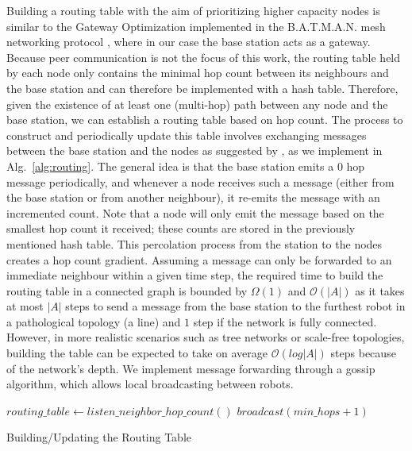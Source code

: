 Building a routing 
table with the aim of prioritizing higher capacity nodes is similar to the Gateway 
Optimization \cite{openMesh2021gateways} implemented in the \ac{B.A.T.M.A.N.} mesh networking
protocol \cite{johnson2008simple}, where in our case the base station acts as a gateway. Because peer communication is not the 
focus of this work, the routing table held by each node only contains the minimal hop count 
between its neighbours and the base station and can therefore
be implemented with a hash table. Therefore, given the existence of at least one (multi-hop) path between any node and the base station, we can establish a routing table based on hop count. The process to construct and periodically update this 
table involves exchanging messages between the base station and the nodes as suggested by 
\cite{abdullah2015detecting}, as we implement in Alg.~\ref{alg:routing}. The general idea is that the base station emits a 0 hop message periodically, and whenever a node receives such a message (either from the base station or from another neighbour), it re-emits the message with an incremented count. Note that a node will only emit the message based on the smallest hop count it received; these counts are stored in the previously mentioned hash table. This percolation process from the station to the nodes creates a hop count gradient.
Assuming a message can only be forwarded to an immediate neighbour within a given time 
step, the required time to build the routing table in a connected graph is bounded by 
$\Omega(1)$ and $\mathcal{O}(|A|)$ as it takes at most $|A|$ steps to send a message from 
the base station to the furthest robot in a pathological topology (a line) and $1$ step if 
the network is fully connected. However, in more realistic scenarios such as tree networks 
or scale-free topologies, building the table can be expected to take on average 
$\mathcal{O}(log|A|)$ steps because of the network's depth. We implement message forwarding through a gossip algorithm, which allows local broadcasting between robots.

\begin{algorithm}[htbp]
\small
\SetAlgoLined
\DontPrintSemicolon
    $routing\_table \longleftarrow listen\_neighbor\_hop\_count()$\;
    \;
    \;
    $broadcast(min\_hops + 1)$\;
\caption{Building/Updating the Routing Table}
\label{alg:routing}
\end{algorithm}

